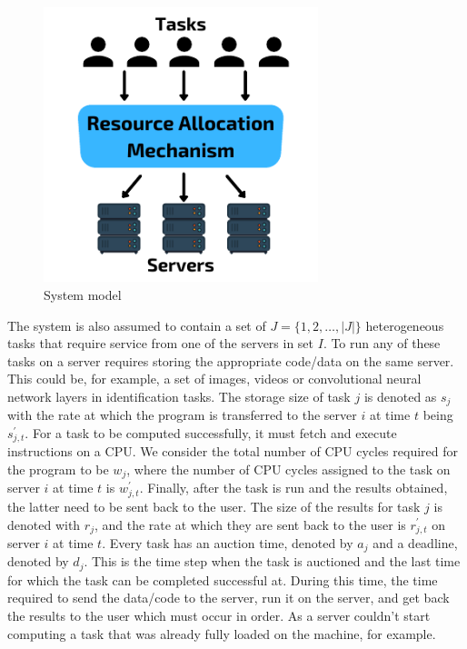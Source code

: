\begin{figure}[h]
    \centering
    \includegraphics[width=8cm]{figures/system_model.pdf}
    \caption{System model}
    \label{fig:system_model}
\end{figure}

The system is also assumed to contain a set of $J = \{1,2,\ldots,\left| J \right|\}$ heterogeneous tasks that require
service from one of the servers in set $I$. To run any of these tasks on a server requires storing the appropriate
code/data on the same server. This could be, for example, a set of images, videos or convolutional neural network
layers in identification
tasks. The storage size of task $j$ is denoted as $s_j$ with the rate at which the program is transferred to the server
$i$ at time $t$ being $s^{'}_{j,t}$. For a task to be computed successfully, it must fetch and execute instructions
on a CPU. We consider the total number of CPU cycles required for the program to be $w_j$, where the number of
CPU cycles assigned to the task on server $i$ at time $t$ is $w^{'}_{j,t}$. Finally, after the task is run and
the results obtained, the latter need to be sent back to the user. The size of the results for task $j$ is denoted with
$r_j$, and the rate at which they are sent back to the user is $r^{'}_{j,t}$ on server $i$ at time $t$. Every task
has an auction time, denoted by $a_j$ and a deadline, denoted by $d_j$. This is the time step when the task is auctioned
and the last time for which the task can be completed successful at.
During this time, the time required to send the data/code to the server, run it on the server, and get back the results
to the user which must occur in order. As a server couldn't start computing a task that was already fully loaded on the
machine, for example.

